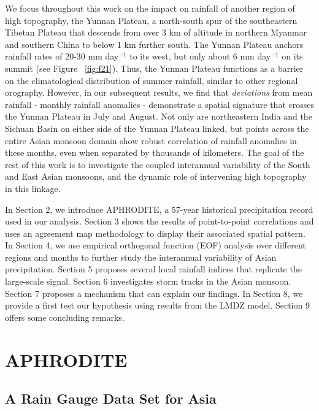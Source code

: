 	We focus throughout this work on the impact on rainfall of another region of high topography, the Yunnan Plateau, a north-south spur of the southeastern Tibetan Plateau that descends from over 3 km of altitude in northern Myanmar and southern China to below 1 km further south. The Yunnan Plateau anchors rainfall rates of 20-30 mm day$^{-1}$ to its west, but only about 6 mm day$^{-1}$ on its summit (see Figure ~\ref{fig:f21}). Thus, the Yunnan Plateau functions as a barrier on the climatological distribution of summer rainfall, similar to other regional orography. However, in our subsequent results, we find that \textit{deviations} from mean rainfall - monthly rainfall anomalies - demonstrate a spatial signature that crosses the Yunnan Plateau in July and August. Not only are northeastern India and the Sichuan Basin on either side of the Yunnan Plateau linked, but points across the entire Asian monsoon domain show robust correlation of rainfall anomalies in these months, even when separated by thousands of kilometers. The goal of the rest of this work is to investigate the coupled interannual variability of the South and East Asian monsoons, and the dynamic role of intervening high topography in this linkage. 
	
	In Section 2, we introduce APHRODITE, a 57-year historical precipitation record used in our analysis. Section 3 shows the results of point-to-point correlations and uses an agreement map methodology to display their associated spatial pattern. In Section 4, we use empirical orthogonal function (EOF) analysis over different regions and months to further study the interannual variability of Asian precipitation. Section 5 proposes several local rainfall indices that replicate the large-scale signal. Section 6 investigates storm tracks in the Asian monsoon. Section 7 proposes a mechanism that can explain our findings. In Section 8, we provide a first test our hypothesis using results from the LMDZ model. Section 9 offers some concluding remarks.
	
\section{APHRODITE}

\subsection{A Rain Gauge Data Set for Asia}


